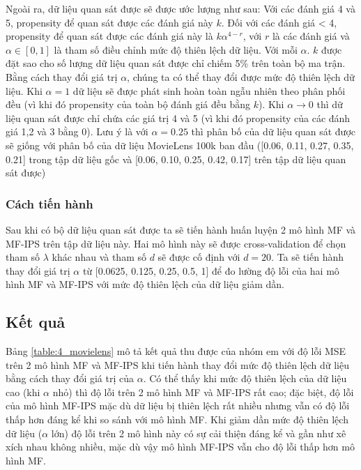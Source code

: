 Ngoài ra, dữ liệu quan sát được sẽ được ước lượng như sau: Với các đánh giá 4 và 5, propensity để quan sát được các đánh giá này $k$. Đối với các đánh giá < 4, propensity để quan sát được các đánh giá này là $k\alpha^{4-r}$, với $r$ là các đánh giá và $\alpha \in [0,1]$ là tham số điều chỉnh mức độ thiên lệch dữ liệu. Với mỗi $\alpha$. $k$ được đặt sao cho số lượng dữ liệu quan sát được chỉ chiếm 5\% trên toàn bộ ma trận. Bằng cách thay đổi giá trị $\alpha$, chúng ta có thể thay đổi được mức độ thiên lệch dữ liệu. Khi $\alpha = 1$ dữ liệu sẽ được phát sinh hoàn toàn ngẫu nhiên theo phân phối đều (vì khi đó propensity của toàn bộ đánh giá đều bằng $k$). Khi $\alpha \rightarrow 0$ thì dữ liệu quan sát được chỉ chứa các giá trị 4 và 5 (vì khi đó propensity của các đánh giá 1,2 và 3 bằng 0). Lưu ý là với $\alpha = 0.25$ thì phân bố của dữ liệu quan sát được sẽ giống với phân bố của dữ liệu MovieLens 100k ban đầu ([0.06, 0.11, 0.27, 0.35, 0.21] trong tập dữ liệu gốc và [0.06, 0.10, 0.25, 0.42, 0.17] trên tập dữ liệu quan sát được)

\subsubsection{Cách tiến hành}
Sau khi có bộ dữ liệu quan sát được ta sẽ tiến hành huấn luyện 2 mô hình MF và MF-IPS trên tập dữ liệu này. Hai mô hình này sẽ được cross-validation để chọn tham số $\lambda$ khác nhau và tham số $d$ sẽ được cố định với $d = 20$. Ta sẽ tiến hành thay đổi giá trị $\alpha$ từ [0.0625, 0.125, 0.25, 0.5, 1] để đo lường độ lỗi của hai mô hình MF và MF-IPS với mức độ thiên lệch của dữ liệu giảm dần.
\subsection{Kết quả}
Bảng \ref{table:4_movielens} mô tả kết quả thu được của nhóm em với độ lỗi MSE trên 2 mô hình MF và MF-IPS khi tiến hành thay đổi mức độ thiên lệch dữ liệu bằng cách thay đổi giá trị của $\alpha$. Có thể thấy khi mức độ thiên lệch của dữ liệu cao (khi $\alpha$ nhỏ) thì độ lỗi trên 2 mô hình MF và MF-IPS rất cao; đặc biệt, độ lỗi của mô hình MF-IPS mặc dù dữ liệu bị thiên lệch rất nhiều nhưng vẫn có độ lỗi thấp hơn đáng kể khi so sánh với mô hình MF. Khi giảm dần mức độ thiên lệch dữ liệu ($\alpha$ lớn) độ lỗi trên 2 mô hình này có sự cải thiện đáng kể và gần như xê xích nhau không nhiều, mặc dù vậy mô hình MF-IPS vẫn cho độ lỗi thấp hơn mô hình MF. 

